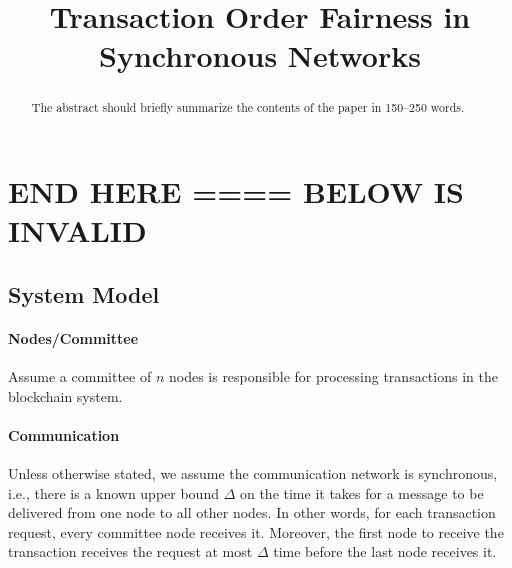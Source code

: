 \documentclass[runningheads]{llncs}
\begin{document}
%
\title{Transaction Order Fairness in Synchronous Networks}
%
%
%
%
\maketitle              %
%
\begin{abstract}
The abstract should briefly summarize the contents of the paper in
150--250 words.

\end{abstract}
%
%







\section{END HERE ==== BELOW IS INVALID}
\subsection{System Model}
\paragraph{Nodes/Committee} Assume a committee of $n$ nodes is responsible for processing transactions in the blockchain system. 

\paragraph{Communication} Unless otherwise stated, we assume the communication network is synchronous, i.e., there is a known upper bound $\Delta$ on the time it takes for a message to be delivered from one node to all other nodes. In other words, for each transaction request, every committee node receives it. Moreover, the first node to receive the transaction receives the request at most $\Delta$ time before the last node receives it. 
\end{document}
